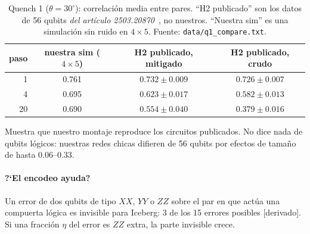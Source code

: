 \documentclass[11pt,a4paper]{article}
\newcommand{\code}[1]{\nolinkurl{#1}}
\begin{document}
\begin{table}[h]\centering\small
\caption{Quench 1 ($\theta=30^\circ$): correlaci\'on media entre pares. ``H2 publicado'' son los datos
de 56 qubits \emph{del art\'iculo 2503.20870}~\cite{haghshenas2026,zenodo}, no nuestros. ``Nuestra sim'' es una simulaci\'on sin ruido
en $4\times5$. Fuente: \code{data/q1\_compare.txt}.}
\begin{tabular}{rccc}
\toprule
paso & nuestra sim ($4\times5$) & H2 publicado, mitigado & H2 publicado, crudo\\
\midrule
1 & 0.761 & $0.732\pm0.009$ & $0.726\pm0.007$\\
4 & 0.695 & $0.623\pm0.017$ & $0.582\pm0.013$\\
20 & 0.690 & $0.554\pm0.040$ & $0.379\pm0.016$\\
\bottomrule
\end{tabular}
\end{table}
\noindent Muestra que nuestro montaje reproduce los circuitos publicados. No dice nada de qubits
l\'ogicos: nuestras redes chicas difieren de 56 qubits por efectos de tama\~no de hasta 0.06--0.33.

\paragraph{?`El encodeo ayuda?} Un error de dos qubits de tipo $XX$, $YY$ o $ZZ$ sobre el par en
que act\'ua una compuerta l\'ogica es invisible para Iceberg: 3 de los 15 errores posibles [derivado].
Si una fracci\'on $\eta$ del error es $ZZ$ extra, la parte invisible crece.
\end{document}
